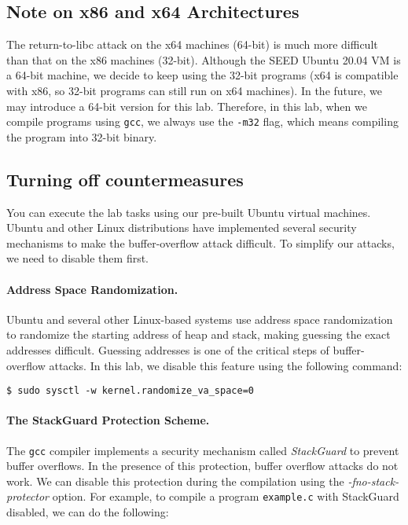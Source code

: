 \subsection{Note on x86 and x64 Architectures}


The return-to-libc attack on the x64 machines (64-bit)
is much more difficult than that on the x86 machines (32-bit).
Although the SEED Ubuntu 20.04 VM is a 64-bit machine,
we decide to keep using the 32-bit programs (x64 is
compatible with x86, so 32-bit programs can still 
run on x64 machines). In the future, we may 
introduce a 64-bit version for this lab. 
Therefore, in this lab, when we compile 
programs using \texttt{gcc}, we always 
use the \texttt{-m32} flag, which means compiling 
the program into 32-bit binary. 


\subsection{Turning off countermeasures}

You can execute the lab tasks using our pre-built Ubuntu virtual machines.
Ubuntu and other Linux distributions have implemented several
security mechanisms to make the buffer-overflow attack difficult.
To simplify our attacks, we need to disable them first.


\paragraph{Address Space Randomization.}
Ubuntu and several other Linux-based systems use address space
randomization to randomize the starting address of heap and
stack, making guessing the exact addresses difficult. Guessing
addresses is one of the critical steps of buffer-overflow attacks.  In
this lab, we disable this feature using the following command:

\begin{lstlisting}
$ sudo sysctl -w kernel.randomize_va_space=0
\end{lstlisting}


\paragraph{The StackGuard Protection Scheme.}
The \texttt{gcc} compiler implements a security mechanism called
\textit{StackGuard} to prevent buffer overflows. In the presence of this
protection, buffer overflow attacks do not work. We can disable this
protection during the compilation using the
\emph{-fno-stack-protector} option. For example, to compile a program
\texttt{example.c} with StackGuard disabled, we can do the following:



